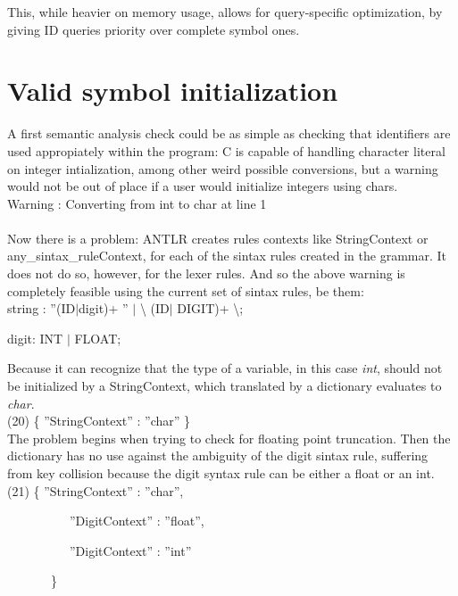 \documentclass[twocolumn,10ptr]{article}
\begin{document}
This, while heavier on memory usage, allows for query-specific optimization, by giving ID queries priority over complete symbol ones.
\section{Valid symbol initialization}
A first semantic analysis check could be as simple as checking that identifiers are used appropiately within the program: C is capable of handling character literal on integer intialization, among other weird possible conversions, but a warning would not be out of place if a user would initialize integers using chars.\\

Warning : Converting from int to char at line 1\\ \\
Now there is a problem: ANTLR creates rules contexts like StringContext or any\_sintax\_ruleContext, for each of the sintax rules created in the grammar. It does not do so, however, for the lexer rules. And so the above warning is completely feasible using the current set of sintax rules, be them:\\

string : \textsc{}''\textsc{}(ID\(\mid\)digit)+ \textsc{}''\textsc{} \(\mid\) \textsc{}\textbackslash\textsc{}\textsc{}  (ID\(\mid\) DIGIT)+ \textsc{}\textbackslash\textsc{}\textsc{};

digit: INT \(\mid\) FLOAT;

Because it can recognize that the type of a variable, in this case \textit{ int}, should not be initialized by a StringContext, which translated by a dictionary evaluates to \textit{char}.\\

(20)
\{  ''StringContext'' : ''char'' \}\\

The problem begins when trying to check for floating point truncation. Then the dictionary has no use against the ambiguity of the digit sintax rule, suffering from key collision because the digit syntax rule can be either a float or an int.\\

(21)
\{  ''StringContext'' : ''char'',

\ \ \ \ \ \ \ \ \ \   ''DigitContext'' : ''float'',
  
\ \ \ \ \ \ \ \ \ \   ''DigitContext'' : ''int''

 \ \ \ \ \ \ \    \}\\
\end{document}
